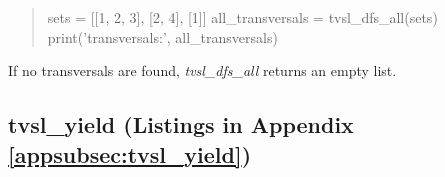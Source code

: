 \begin{minipage}{\linewidth} \largev  
\begin{quote}
\begin{python}
sets = [[1, 2, 3], [2, 4], [1]]
all_transversals = tvsl_dfs_all(sets)
print('\nAll transversals:', all_transversals)
\end{python}
\end{quote}
\end{minipage}


If no transversals are found, \textit{tvsl\_dfs\_all} returns an empty list. %


\subsection{tvsl\_yield (Listings in Appendix \ref{appsubsec:tvsl_yield})} \label{subsec:tvsl_yield}



